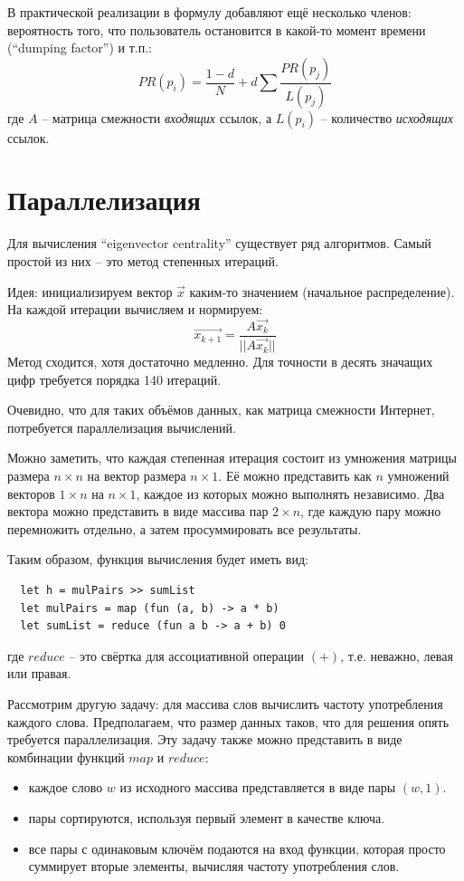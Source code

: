 \documentclass[a4paper,11pt]{article}
\begin{document}
В практической реализации в формулу добавляют ещё несколько членов:
вероятность того, что пользователь остановится в какой-то момент времени
(``dumping factor'') и т.п.:
\begin{equation*}
  PR(p_i) = \frac{1-d}{N} + d \sum \frac{PR(p_j)}{L(p_j)}
\end{equation*}
где $A$ -- матрица смежности \emph{входящих} ссылок, а $L(p_i)$ -- 
количество \emph{исходящих} ссылок.

\section{Параллелизация}
Для вычисления ``eigenvector centrality'' существует ряд алгоритмов. Самый
простой из них -- это метод степенных итераций.

Идея: инициализируем вектор $\vec{x}$ каким-то значением (начальное 
распределение). На каждой итерации вычисляем и нормируем:
\begin{equation*}
  \vec{x_{k+1}} = \frac{A \vec{x_k}}{||A \vec{x_k}||}
\end{equation*}
Метод сходится, хотя достаточно медленно. Для точности в десять значащих
цифр требуется порядка 140 итераций.

Очевидно, что для таких объёмов данных, как матрица смежности Интернет,
потребуется параллелизация вычислений.

Можно заметить, что каждая степенная итерация состоит из умножения матрицы
размера $n \times n$ на вектор размера $n \times 1$. Её можно представить
как $n$ умножений векторов $1 \times n$ на $n \times 1$, каждое из которых
можно выполнять независимо. Два вектора можно представить в виде массива
пар $2 \times n$, где каждую пару можно перемножить отдельно, а затем
просуммировать все результаты.

Таким образом, функция вычисления будет иметь вид:
\begin{lstlisting}
  let h = mulPairs >> sumList
  let mulPairs = map (fun (a, b) -> a * b)
  let sumList = reduce (fun a b -> a + b) 0
\end{lstlisting}
где $reduce$ -- это свёртка для ассоциативной операции $(+)$, т.е. неважно,
левая или правая.

Рассмотрим другую задачу: для массива слов вычислить частоту употребления
каждого слова. Предполагаем, что размер данных таков, что для решения опять
требуется параллелизация. Эту задачу также можно представить в виде комбинации
функций $map$ и $reduce$:
\begin{itemize}
\item каждое слово $w$ из исходного массива представляется в виде пары $(w, 1)$.
\item пары сортируются, используя первый элемент в качестве ключа.
\item все пары с одинаковым ключём подаются на вход функции, которая просто
  суммирует вторые элементы, вычисляя частоту употребления слов.
\end{itemize}
\end{document}
